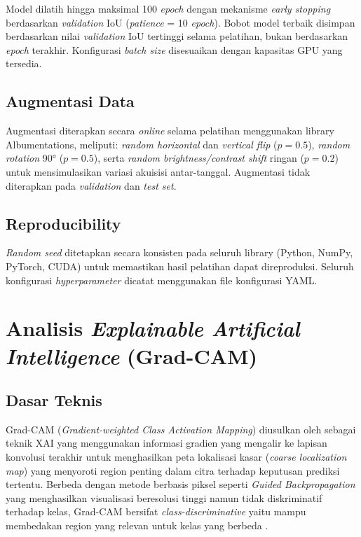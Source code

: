 Model dilatih hingga maksimal 100 \textit{epoch} dengan mekanisme \textit{early stopping} berdasarkan \textit{validation} IoU (\textit{patience} = 10 \textit{epoch}). Bobot model terbaik disimpan berdasarkan nilai \textit{validation} IoU tertinggi selama pelatihan, bukan berdasarkan \textit{epoch} terakhir. Konfigurasi \textit{batch size} disesuaikan dengan kapasitas GPU yang tersedia.

\subsection{Augmentasi Data}

Augmentasi diterapkan secara \textit{online} selama pelatihan menggunakan library Albumentations, meliputi: \textit{random horizontal} dan \textit{vertical flip} ($p = 0.5$), \textit{random rotation} 90° ($p = 0.5$), serta \textit{random brightness/contrast shift} ringan ($p = 0.2$) untuk mensimulasikan variasi akuisisi antar-tanggal. Augmentasi tidak diterapkan pada \textit{validation} dan \textit{test set}.

\subsection{Reproducibility}

\textit{Random seed} ditetapkan secara konsisten pada seluruh library (Python, NumPy, PyTorch, CUDA) untuk memastikan hasil pelatihan dapat direproduksi. Seluruh konfigurasi \textit{hyperparameter} dicatat menggunakan file konfigurasi YAML.

\section{Analisis \textit{Explainable Artificial Intelligence} (Grad-CAM)}

\subsection{Dasar Teknis}

Grad-CAM (\textit{Gradient-weighted Class Activation Mapping}) diusulkan oleh \cite{DBLP:journals/corr/SelvarajuDVCPB16} sebagai teknik XAI yang menggunakan informasi gradien yang mengalir ke lapisan konvolusi terakhir untuk menghasilkan peta lokalisasi kasar (\textit{coarse localization map}) yang menyoroti region penting dalam citra terhadap keputusan prediksi tertentu. Berbeda dengan metode berbasis piksel seperti \textit{Guided Backpropagation} \citep{springenberg2014striving} yang menghasilkan visualisasi beresolusi tinggi namun tidak diskriminatif terhadap kelas, Grad-CAM bersifat \textit{class-discriminative} yaitu mampu membedakan region yang relevan untuk kelas yang berbeda \cite{DBLP:journals/corr/SelvarajuDVCPB16}.

